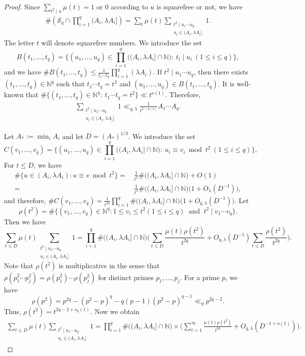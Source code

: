 \documentclass[10pt,a4paper]{amsart}
\numberwithin{equation}{section}
\newcommand{\N}{\mathbb N}
\newcommand{\1}{\mathbf 1}
\begin{document}
\begin{proof} Since $\sum_{t^2\mid u}\mu(t)=1$ or $0$ according to $u$ is squarefree or not, we have
\begin{align}\label{bound0}\#\left(
 \mathcal S_q\cap\prod_{i=1}^q(A_i,\lambda A_i]
 \right)=\sum_{t}\mu(t)\sum_{\substack{t^2\mid u_1\cdots u_q \\ u_i\in (A_i,\lambda A_i]}}1.\end{align}
The letter $t$ will denote squarefree numbers. We introduce the set 
$$B(t_1,\ldots,t_q)=\{(u_1,\ldots,u_q)\in \prod_{i=1}^q\bigl((A_i,\lambda A_i]\cap\N\bigr):\ t_i\mid u_i ~(1\leq i\leq q)\},$$
 and we have
$\# B(t_1,\ldots,t_q) \leq \frac{1}{t_1\cdots t_q}\prod_{i=1}^q(\lambda A_i)$. 
If $t^2\mid u_1\cdots u_q$, then there exists $(t_1,\ldots,t_q)\in \N^q$ such that $t_1\cdots t_q=t^2$ and $(u_1,\ldots,u_q)\in B(t_1,\ldots,t_q)$. It is well-known that $\#\{(t_1,\ldots,t_q)\in \N^q:\ t_1\cdots t_q=t^2\}\ll t^{o(1)}$. Therefore, 
\begin{align}\label{bound1}\sum_{\substack{t^2\mid u_1\cdots u_q \\ u_i\in (A_i,\lambda A_i]}}1\ll_{q,\lambda} \frac{1}{t^{2-o(1)}}A_1\cdots A_q.\end{align}

Let $A_*:=\min_iA_i$ and let $D=(A_\ast)^{1/3}$. We introduce the set 
$$C(v_1,\ldots,v_q)=\{(u_1,\ldots,u_q)\in \prod_{i=1}^q\bigl((A_i,\lambda A_i]\cap\N\bigr):\ u_i\equiv v_i\bmod {t^2} ~(1\leq i\leq q)\},$$
For $t\leq D$, we have 
\begin{align*}\#\{u\in (A_i,\lambda A_i): u\equiv v\bmod {t^2}\}=&\, \frac{1}{t^2}\#\bigl((A_i,\lambda A_i]\cap\N\bigr)+O(1)
\\ =&\,\frac{1}{t^2}\#\bigl((A_i,\lambda A_i]\cap\N\bigr)\big(1+O_{\lambda}(D^{-1})\big),\end{align*}
and therefore,
$\# C(v_1,\ldots,v_q) =\frac{1}{t^{2q}} \prod_{i=1}^q\#\bigl((A_i,\lambda A_i]\cap\N\bigr)\big(1+O_{q,\lambda}(D^{-1})\big)$. 
Let 
$$\rho(t^2)=\#\{(v_1,\ldots,v_q)\in \N^q: 1\leq v_i\leq t^2(1\leq i\leq q)\ \textrm{ and }\ t^2\mid v_1\cdots v_q\}.$$
Then we have 
$$\sum_{t\leq D}\mu(t)\sum_{\substack{t^2\mid u_1\cdots u_q \\ u_i\in (A_i,\lambda A_i]}}1=\prod_{i=1}^q\#\bigl((A_i,\lambda A_i]\cap\N\bigr)\Big(\sum_{t\leq D}\frac{\mu(t)\rho(t^2)}{t^{2q}}+O_{q,\lambda}(D^{-1})\sum_{t\leq D}\frac{\rho(t^2)}{t^{2q}}\Big).$$
Note that $\rho(t^2)$ is multiplicative in the sense that $\rho(p_1^2\cdots p_j^2)=\rho(p_1^2)\cdots \rho(p_j^2)$ for distinct primes $p_1,\ldots,p_j$. 
For a prime $p$, we have 
$$\rho(p^2)=p^{2q}-(p^2-p)^q-q(p-1)(p^2-p)^{q-1}\ll_{q}p^{2q-2}.$$
Thus, $\rho(t^2)=t^{2q-2+o_{q}(1)}$. Now we obtain
\begin{align}\label{bound2}\sum_{t\leq D}\mu(t)\sum_{\substack{t^2\mid u_1\cdots u_q \\ u_i\in (A_i,\lambda A_i]}}1=\prod_{i=1}^q\#\bigl((A_i,\lambda A_i]\cap\N\bigr)
\times\Big(\sum_{t=1}^\infty\frac{\mu(t)\rho(t^2)}{t^{2q}}+O_{q,\lambda}(D^{-1+o(1)})\Big).\end{align}


\end{proof}
\end{document}
